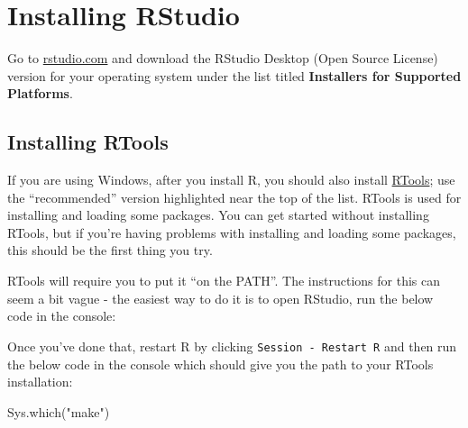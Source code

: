 \documentclass[
  oneside]{book}
\newenvironment{Shaded}{\begin{snugshade}}{\end{snugshade}}
\newcommand{\AttributeTok}[1]{\textcolor[rgb]{0.77,0.63,0.00}{#1}}
\newcommand{\ConstantTok}[1]{\textcolor[rgb]{0.00,0.00,0.00}{#1}}
\newcommand{\FunctionTok}[1]{\textcolor[rgb]{0.00,0.00,0.00}{#1}}
\newcommand{\NormalTok}[1]{#1}
\newcommand{\SpecialCharTok}[1]{\textcolor[rgb]{0.00,0.00,0.00}{#1}}
\newcommand{\StringTok}[1]{\textcolor[rgb]{0.31,0.60,0.02}{#1}}
\begin{document}
\hypertarget{installing-rstudio}{%
\section{Installing RStudio}\label{installing-rstudio}}

Go to \href{https://www.rstudio.com/products/rstudio/download/\#download}{rstudio.com} and download the RStudio Desktop (Open Source License) version for your operating system under the list titled \textbf{Installers for Supported Platforms}.

\hypertarget{installing-rtools}{%
\subsection{Installing RTools}\label{installing-rtools}}

If you are using Windows, after you install R, you should also install \href{https://cran.rstudio.com/bin/windows/Rtools/}{RTools}; use the ``recommended'' version highlighted near the top of the list. RTools is used for installing and loading some packages. You can get started without installing RTools, but if you're having problems with installing and loading some packages, this should be the first thing you try.

RTools will require you to put it ``on the PATH''. The instructions for this can seem a bit vague - the easiest way to do it is to open RStudio, run the below code in the console:

\begin{Shaded}
\end{Shaded}

Once you've done that, restart R by clicking \texttt{Session\ -\ Restart\ R} and then run the below code in the console which should give you the path to your RTools installation:

\begin{Shaded}
\begin{Highlighting}[]
\FunctionTok{Sys.which}\NormalTok{(}\StringTok{"make"}\NormalTok{)}
\end{Highlighting}
\end{Shaded}
\end{document}
